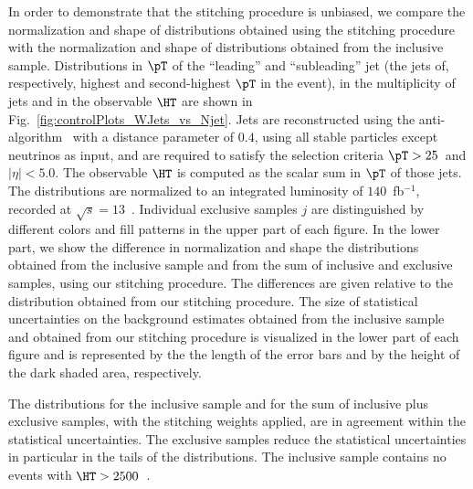 In order to demonstrate that the stitching procedure is unbiased,
we compare the normalization and shape of distributions obtained using the stitching procedure with the normalization and shape of distributions obtained from the inclusive sample.
Distributions in $\pT$ of the ``leading'' and ``subleading'' jet (the jets of, respectively, highest and second-highest $\pT$ in the event),
in the multiplicity of jets and in the observable $\HT$ are shown in Fig.~\ref{fig:controlPlots_WJets_vs_Njet}.
Jets are reconstructed using the anti-\kt algorithm~\cite{Cacciari:2008gp,Cacciari:2011ma} with a distance parameter of $0.4$,
using all stable particles except neutrinos as input, and are required to satisfy the selection criteria $\pT > 25$~\GeV and $\vert\eta\vert < 5.0$.
The observable $\HT$ is computed as the scalar sum in $\pT$ of those jets.
The distributions are normalized to an integrated luminosity of $140$~fb$^{-1}$, recorded at $\sqrt{s}=13$~\TeV.
Individual exclusive samples $j$ are distinguished by different colors and fill patterns in the upper part of each figure.
In the lower part, we show the difference in normalization and shape the distributions obtained from the inclusive sample and from the sum of inclusive and exclusive samples,
using our stitching procedure.
The differences are given relative to the distribution obtained from our stitching procedure.
The size of statistical uncertainties on the background estimates obtained from the inclusive sample and obtained from our stitching procedure
is visualized in the lower part of each figure and is represented by the the length of the error bars and by the height of the dark shaded area, respectively.

The distributions for the inclusive sample and for the sum of inclusive plus exclusive samples, with the stitching weights applied, are in agreement within the statistical uncertainties.
The exclusive samples reduce the statistical uncertainties in particular in the tails of the distributions.
The inclusive sample contains no events with $\HT > 2500$~\GeV. 

